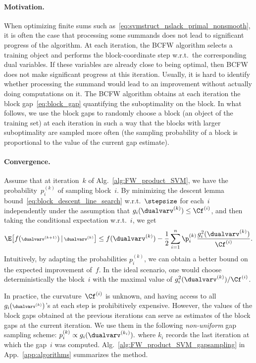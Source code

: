 \documentclass{article}
\begin{document}
\paragraph{Motivation.}
When optimizing finite sums such as~\eqref{eq:svmstruct_nslack_primal_nonsmooth}, it is often the case that processing some summands does not lead to significant progress of the algorithm. 
%
At each iteration, the BCFW algorithm selects a training object and performs the block-coordinate step w.r.t.\ the corresponding dual variables. 
If these variables are already close to being optimal, then BCFW does not make significant progress at this iteration. Usually, it is hard to identify whether processing the summand would lead to an improvement without actually doing computations on it. The BCFW algorithm obtains at each iteration the block gap~\eqref{eq:block_gap} quantifying the suboptimality on the block. In what follows, we use the block gaps to randomly choose a block (an object of the training set) at each iteration in such a way that the blocks with larger suboptimality are sampled more often (the sampling probability of a block is proportional to the value of the current gap estimate).

%

\paragraph{Convergence.}
%
%
%
%
%
%
%

Assume that at iteration~$k$ of Alg.~\ref{alg:FW_product_SVM}, we have the probability~$p_i^{(k)}$ 
%
of sampling block~$i$.
By minimizing the descent lemma bound~\eqref{eq:block_descent_line_search} w.r.t.\ $\stepsize$ for each~$i$ independently under the assumption that $g_i(\dualvarv^{(k)}) \leq \Cf^{(i)}$, and then taking the conditional expectation w.r.t.\ $i$, we get
\begin{equation}
\label{eq:expectedImprovement}
\E\big[ f( {\scriptstyle \dualvarv^{(k+1)}})\,|\, {\scriptstyle \dualvarv^{(k)} }\big]
  \le f(\dualvarv^{(k)}) - \frac{1}{2} \sum_{i=1}^n \p_i^{(k)} \frac{g_i^2(\dualvarv^{(k)})}{\Cf^{(i)}}.
\end{equation}
%
Intuitively, by adapting the probabilities $p_i^{(k)}$, we can obtain a better bound on the expected improvement of~$f$.
In the ideal scenario, one would choose deterministically the block~$i$ with the maximal value of $g_i^2(\dualvarv^{(k)})/\Cf^{(i)}$.

In practice, the curvature~$\Cf^{(i)}$ is unknown, and having access to all $g_i( {\scriptstyle \dualvarv^{(k)} })$'s at each step is prohibitively expensive.
However, the values of the block gaps obtained at the previous iterations can serve as estimates of the block gaps at the current iteration.
We use them in the following \emph{non-uniform} gap sampling scheme:
$
p_i^{(k)} \propto {g}_i(\dualvarv^{(k_i)}).
$ 
 where $k_i$ records the last iteration at which the gap~$i$ was computed.
%
%
%
%
Alg.~\ref{alg:FW_product_SVM_gapsampling} in App.~\ref{app:algorithms} summarizes the method.
\end{document}
